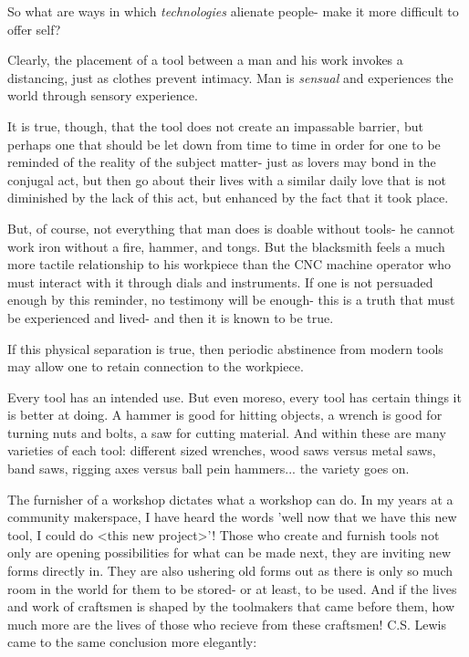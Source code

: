 \documentclass[letterpaper]{article}
\begin{document}
So what are ways in which \textit{technologies} alienate people- make it more difficult to offer self?

Clearly, the placement of a tool between a man and his work invokes a distancing, just as clothes prevent intimacy. Man is \textit{sensual} and experiences the world through sensory experience.

It is true, though, that the tool does not create an impassable barrier, but perhaps one that should be let down from time to time in order for one to be reminded of the reality of the subject matter- just as lovers may bond in the conjugal act, but then go about their lives with a similar daily love that is not diminished by the lack of this act, but enhanced by the fact that it took place.


But, of course, not everything that man does is doable without tools- he cannot work iron without a fire, hammer, and tongs. But the blacksmith feels a much more tactile relationship to his workpiece than the CNC machine operator who must interact with it through dials and instruments. If one is not persuaded enough by this reminder, no testimony will be enough- this is a truth that must be experienced and lived- and then it is known to be true.

If this physical separation is true, then periodic abstinence from modern tools may allow one to retain connection to the workpiece.

Every tool has an intended use. But even moreso, every tool has certain things it is better at doing. A hammer is good for hitting objects, a wrench is good for turning nuts and bolts, a saw for cutting material. And within these are many varieties of each tool: different sized wrenches, wood saws versus metal saws, band saws, rigging axes versus ball pein hammers... the variety goes on.

The furnisher of a workshop dictates what a workshop can do. In my years at a community makerspace, I have heard the words 'well now that we have this new tool, I could do <this new project>'! Those who create and furnish tools not only are opening possibilities for what can be made next, they are inviting new forms directly in. They are also ushering old forms out as there is only so much room in the world for them to be stored- or at least, to be used. And if the lives and work of craftsmen is shaped by the toolmakers that came before them, how much more are the lives of those who recieve from these craftsmen! C.S. Lewis came to the same conclusion more elegantly:
\end{document}
